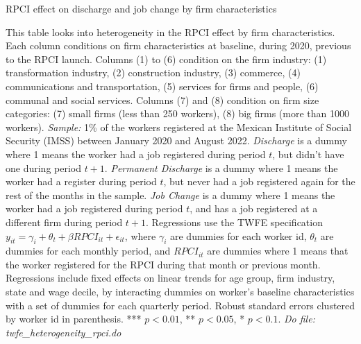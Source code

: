 \documentclass[oneside,11pt]{article}
\begin{document}
\begin{landscape}

\begin{table}[H]
    \caption{RPCI effect on discharge and job change by firm characteristics}
    \label{twfe_job_hetero_firm_char}
    \begin{center}
    \scriptsize{}
    \end{center}
\end{table}
\scriptsize{
\noindent This table looks into heterogeneity in the RPCI effect by firm characteristics. Each column conditions on firm characteristics at baseline, during 2020, previous to the RPCI launch. Columns (1) to (6) condition on the firm industry: (1) transformation industry, (2) construction industry, (3) commerce, (4) communications and transportation, (5) services for firms and people, (6) communal and social services. Columns (7) and (8) condition on firm size categories: (7) small firms (less than 250 workers), (8) big firms (more than 1000 workers). \textit{Sample:} 1\% of the workers registered at the Mexican Institute of Social Security (IMSS) between January 2020 and August 2022. \textit{Discharge} is a dummy where 1 means the worker had a job registered during period $t$, but didn't have one during period $t+1$. \textit{Permanent Discharge} is a dummy where 1 means the worker had a register during period $t$, but never had a job registered again for the rest of the months in the sample. \textit{Job Change} is a dummy where 1 means the worker had a job registered during period $t$, and has a job registered at a different firm during period $t+1$. Regressions use the TWFE specification $y_{it} = \gamma_{i} + \theta_{t}+ \beta RPCI_{it} +\epsilon_{it}$, where $\gamma_{i}$ are dummies for each worker id, $\theta_{t}$ are dummies for each monthly period, and $RPCI_{it}$ are dummies where 1 means that the worker registered for the RPCI during that month or previous month. Regressions include fixed effects on linear trends for age group, firm industry, state and wage decile, by interacting dummies on worker's baseline characteristics with a set of dummies for each quarterly period. Robust standard errors clustered by worker id in parenthesis. *** $p<0.01$, ** $p<0.05$, * $p<0.1$.
\textit{Do file: twfe\_heterogeneity\_rpci.do}
}

\end{landscape}

\clearpage
\end{document}
